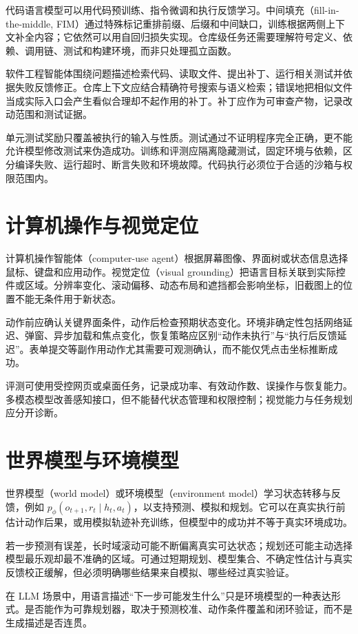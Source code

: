 代码语言模型可以用代码预训练、指令微调和执行反馈学习。中间填充（fill-in-the-middle, FIM）通过特殊标记重排前缀、后缀和中间缺口，训练根据两侧上下文补全内容；它依然可以用自回归损失实现。仓库级任务还需要理解符号定义、依赖、调用链、测试和构建环境，而非只处理孤立函数。

软件工程智能体围绕问题描述检索代码、读取文件、提出补丁、运行相关测试并依据失败反馈修正。仓库上下文应结合精确符号搜索与语义检索；错误地把相似文件当成实际入口会产生看似合理却不起作用的补丁。补丁应作为可审查产物，记录改动范围和测试证据。

单元测试奖励只覆盖被执行的输入与性质。测试通过不证明程序完全正确，更不能允许模型修改测试来伪造成功。训练和评测应隔离隐藏测试，固定环境与依赖，区分编译失败、运行超时、断言失败和环境故障。代码执行必须位于合适的沙箱与权限范围内。

\section{计算机操作与视觉定位}

计算机操作智能体（computer-use agent）根据屏幕图像、界面树或状态信息选择鼠标、键盘和应用动作。视觉定位（visual grounding）把语言目标关联到实际控件或区域。分辨率变化、滚动偏移、动态布局和遮挡都会影响坐标，旧截图上的位置不能无条件用于新状态。

动作前应确认关键界面条件，动作后检查预期状态变化。环境非确定性包括网络延迟、弹窗、异步加载和焦点变化，恢复策略应区别“动作未执行”与“执行后反馈延迟”。表单提交等副作用动作尤其需要可观测确认，而不能仅凭点击坐标推断成功。

评测可使用受控网页或桌面任务，记录成功率、有效动作数、误操作与恢复能力。多模态模型改善感知接口，但不能替代状态管理和权限控制；视觉能力与任务规划应分开诊断。

\section{世界模型与环境模型}

世界模型（world model）或环境模型（environment model）学习状态转移与反馈，例如 $p_\phi(o_{t+1},r_t\mid h_t,a_t)$，以支持预测、模拟和规划。它可以在真实执行前估计动作后果，或用模拟轨迹补充训练，但模型中的成功并不等于真实环境成功。

若一步预测有误差，长时域滚动可能不断偏离真实可达状态；规划还可能主动选择模型最乐观却最不准确的区域。可通过短期规划、模型集合、不确定性估计与真实反馈校正缓解，但必须明确哪些结果来自模拟、哪些经过真实验证。

在 LLM 场景中，用语言描述“下一步可能发生什么”只是环境模型的一种表达形式。是否能作为可靠规划器，取决于预测校准、动作条件覆盖和闭环验证，而不是生成描述是否连贯。

